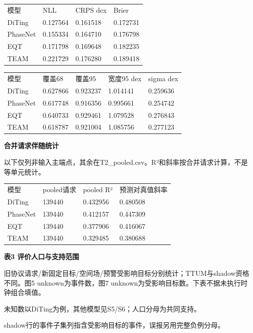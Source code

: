 \documentclass[UTF8,a4paper,11pt]{ctexart}
\begin{document}
\begin{longtable}{llll}
模型 & NLL & CRPS dex & Brier \\
DiTing & 0.127564 & 0.161518 & 0.172731 \\
PhaseNet & 0.155334 & 0.164710 & 0.176798 \\
EQT & 0.171798 & 0.169648 & 0.182235 \\
TEAM & 0.221729 & 0.176280 & 0.189418 \\
\end{longtable}

\begin{longtable}{lllll}
模型 & 覆盖68 & 覆盖95 & 宽度95 dex & sigma dex \\
DiTing & 0.627866 & 0.923237 & 1.014141 & 0.259636 \\
PhaseNet & 0.617748 & 0.916356 & 0.995661 & 0.254742 \\
EQT & 0.640733 & 0.929461 & 1.079528 & 0.276843 \\
TEAM & 0.618787 & 0.921004 & 1.085756 & 0.277123 \\
\end{longtable}

\par\textbf{合并请求伴随统计}\par

以下仅列非输入主端点，其余在T2\_pooled.csv。R²和斜率按合并请求计算，不是等单元统计。

\begin{longtable}{llll}
模型 & pooled请求 & pooled R² & 预测对真值斜率 \\
DiTing & 139440 & 0.432956 & 0.480508 \\
PhaseNet & 139440 & 0.412157 & 0.447309 \\
EQT & 139440 & 0.377906 & 0.416067 \\
TEAM & 139440 & 0.329485 & 0.380688 \\
\end{longtable}
\par\textbf{表3 评价人口与支持范围}\par

旧协议请求/新固定目标/空间场/预警受影响目标分别统计；TTUM与shadow资格不同。图5 unknown为事件数，图7 unknown为受影响目标数。下表不据未执行时钟组合填值。

未知数以DiTing为例，其他模型见S5/S6；人口分母为共同支持。

shadow行的事件子集列指含受影响目标的事件，误报另用完整负例分母。
\end{document}
